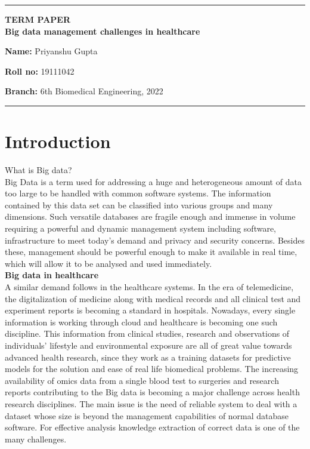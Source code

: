 \documentclass[10pt,a4paper,twoside]{article}
\begin{document}
\begin{center}
\hrule

\vspace{.4cm}
{\bf {\Large TERM PAPER  }}\\
\vspace{.3cm}
{\bf {\huge Big data management challenges in healthcare }}
\vspace{.3cm}
\end{center}

{\bf Name:}  Priyanshu Gupta

{\bf Roll no:}  19111042 

{\bf Branch: } 6th Biomedical Engineering, 2022 
\\
\hrule

\vspace{.3cm}
\section*{Introduction} 
What is Big data?\\
Big Data is a term used for addressing a huge and heterogeneous amount of data too large to be handled with common software systems. The information contained by this data set can be classified into various groups and many dimensions. Such versatile databases are fragile enough and immense in volume requiring a powerful and dynamic management system including software, infrastructure to meet today’s demand and privacy and security concerns. Besides these, management should be powerful enough to make it available in real time, which will allow it to be analysed and used immediately.\\
 
\textbf{Big data in healthcare}\\
A similar demand follows in the healthcare systems. In the era of telemedicine, the digitalization of medicine along with medical records and all clinical test and experiment reports is becoming a standard in hospitals. Nowadays, every single information is working through cloud and healthcare is becoming one such discipline. This information from clinical studies, research and observations of individuals’ lifestyle and environmental exposure are all of great value towards advanced health research, since they work as a training datasets for predictive models for the solution and ease of real life biomedical problems. The increasing availability of omics data from a single blood test to surgeries and research reports contributing to the Big data is becoming a major challenge across health research disciplines. 
The main issue is the need of reliable system to deal with a dataset whose size is beyond the management capabilities of normal database software. For effective analysis knowledge extraction of correct data is one of the many challenges.    \\
\end{document}
